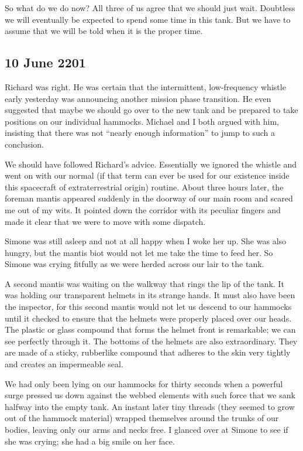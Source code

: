 \documentclass[]{article}
\begin{document}
So what do we do now? All three of us agree that we should just wait.  Doubtless we will eventually be expected to spend some time in this tank.  But we have to assume that we will be told when it is the proper time.

\subsection*{10 June 2201}

Richard was right.  He was certain that the intermittent, low-frequency whistle early yesterday was announcing another mission phase transition.  He even suggested that maybe we should go over to the new tank and be prepared to take positions on our individual hammocks.  Michael and I both argued with him, insisting that there was not “nearly enough information” to jump to such a conclusion.

We should have followed Richard’s advice.  Essentially we ignored the whistle and went on with our normal (if that term can ever be used for our existence inside this spacecraft of extraterrestrial origin) routine.  About three hours later, the foreman mantis appeared suddenly in the doorway of our main room and scared me out of my wits.  It pointed down the corridor with its peculiar fingers and made it clear that we were to move with some dispatch.

Simone was still asleep and not at all happy when I woke her up.  She was also hungry, but the mantis biot would not let me take the time to feed her.  So Simone was crying fitfully as we were herded across our lair to the tank.

A second mantis was waiting on the walkway that rings the lip of the tank.  It was holding our transparent helmets in its strange hands.  It must also have been the inspector, for this second mantis would not let us descend to our hammocks until it checked to ensure that the helmets were properly placed over our heads.  The plastic or glass compound that forms the helmet front is remarkable; we can see perfectly through it.  The bottoms of the helmets are also extraordinary.  They are made of a sticky, rubberlike compound that adheres to the skin very tightly and creates an impermeable seal.

We had only been lying on our hammocks for thirty seconds when a powerful surge pressed us down against the webbed elements with such force that we sank halfway into the empty tank.  An instant later tiny threads (they seemed to grow out of the hammock material) wrapped themselves around the trunks of our bodies, leaving only our arms and necks free.  I glanced over at Simone to see if she was crying; she had a big smile on her face.
\end{document}
